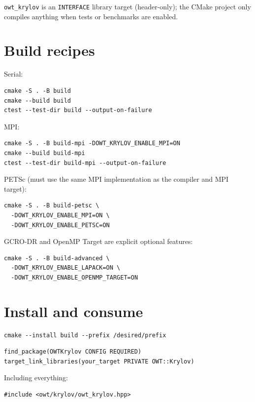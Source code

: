 \documentclass[11pt,a4paper]{report}
\begin{document}
\lstinline!owt_krylov! is an \texttt{INTERFACE} library target (header-only); the
CMake project only compiles anything when tests or benchmarks are
enabled.

\section{Build recipes}
\label{sec:2.2}

Serial:
\begin{lstlisting}[style=bashstyle]
cmake -S . -B build
cmake --build build
ctest --test-dir build --output-on-failure
\end{lstlisting}

MPI:
\begin{lstlisting}[style=bashstyle]
cmake -S . -B build-mpi -DOWT_KRYLOV_ENABLE_MPI=ON
cmake --build build-mpi
ctest --test-dir build-mpi --output-on-failure
\end{lstlisting}

PETSc (must use the same MPI implementation as the compiler and MPI
target):
\begin{lstlisting}[style=bashstyle]
cmake -S . -B build-petsc \
  -DOWT_KRYLOV_ENABLE_MPI=ON \
  -DOWT_KRYLOV_ENABLE_PETSC=ON
\end{lstlisting}

GCRO-DR and OpenMP Target are explicit optional features:
\begin{lstlisting}[style=bashstyle]
cmake -S . -B build-advanced \
  -DOWT_KRYLOV_ENABLE_LAPACK=ON \
  -DOWT_KRYLOV_ENABLE_OPENMP_TARGET=ON
\end{lstlisting}

\section{Install and consume}
\label{sec:2.3}

\begin{lstlisting}[style=bashstyle]
cmake --install build --prefix /desired/prefix
\end{lstlisting}

\begin{lstlisting}[style=cppstyle,language={}]
find_package(OWTKrylov CONFIG REQUIRED)
target_link_libraries(your_target PRIVATE OWT::Krylov)
\end{lstlisting}

Including everything:
\begin{lstlisting}
#include <owt/krylov/owt_krylov.hpp>
\end{lstlisting}
\end{document}
